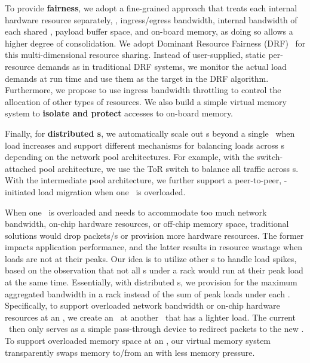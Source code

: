 To provide \textbf{fairness}, we adopt a fine-grained approach that treats each internal hardware resource separately, \eg, ingress/egress bandwidth, internal bandwidth of each shared \nt, payload buffer space, and on-board memory, as doing so allows a higher degree of consolidation.
We adopt Dominant Resource Fairness (DRF)~\cite{DRF} for this multi-dimensional resource sharing.
Instead of user-supplied, static per-resource demands as in traditional DRF systems, we monitor the actual load demands at run time and use them as the target in the DRF algorithm.
Furthermore, we propose to use ingress bandwidth throttling to control the allocation of other types of resources.
We also build a simple virtual memory system to \textbf{isolate and protect} accesses to on-board memory. %

Finally, for \textbf{distributed \snic{}s}, we automatically scale out \nt{}s beyond a single \snic\ when load increases and support different mechanisms for balancing loads across \snic{}s depending on the network pool architectures.
For example, with the switch-attached pool architecture, we use the ToR switch to balance all traffic across \snic{}s.
With the intermediate pool architecture, we further support a peer-to-peer, \snic-initiated load migration when one \snic\ is overloaded.

When one \snic\ is overloaded and needs to accommodate too much network bandwidth, on-chip hardware resources, or off-chip memory space, traditional solutions would drop packets/\nt{}s or provision more hardware resources. The former impacts application performance, and the latter results in resource wastage when loads are not at their peaks. 
Our idea is to utilize other \snic{}s to handle load spikes, based on the observation that not all \snic{}s under a rack would run at their peak load at the same time. Essentially, with distributed \snic{}s, we provision for the maximum aggregated bandwidth in a rack instead of the sum of peak loads under each \snic.
Specifically, to support overloaded network bandwidth or on-chip hardware resources at an \snic, we create an \nt\ at another \snic\ that has a lighter load. 
The current \snic\ then only serves as a simple pass-through device to redirect packets to the new \snic.
To support overloaded memory space at an \snic, our virtual memory system transparently swaps memory to/from an \snic{} with less memory pressure.
\fi

